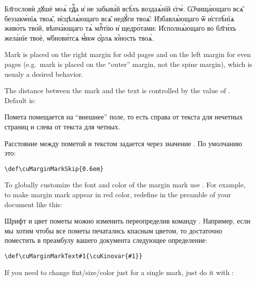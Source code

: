 \begin{center}
\begin{churchslavonic}
\let\hMn=\cuMarginMark
\let\hKv=\cuKinovar
\parbox{0.75\textwidth}{%
  \textwidth
  \hMn{в҃}\hKv Бл҃гословѝ дꙋшѐ моѧ̀ гдⷭ҇а и҆ не забыва́й всѣ́хъ  воздаѧ́нїй є҆гѡ̀. 
  \hMn{а҃}\hKv Ѡ҆чища́ющаго всѧ̑ беззакѡ́нїѧ твоѧ̑, и҆сцѣлѧ́ющаго  всѧ̑ недꙋ́ги твоѧ̑:
  \hMn{в҃}\hKv И҆збавлѧ́ющаго ѿ и҆стлѣ́нїѧ  живо́тъ тво́й, вѣнча́ющаго тѧ̀ млⷭ҇тїю и҆ щедро́тами: 
  \hMn{а҃}\hKv И҆сполнѧ́ющаго во бл҃ги́хъ жела́нїе твоѐ, ѡ҆бнови́тсѧ  ꙗ҆́кѡ ѻ҆́рлѧ ю҆́ность твоѧ̀.
}
\end{churchslavonic}
\end{center}

\begin{EN}
Mark is placed on the right margin for odd pages and on the left margin for even pages (e.g.~mark is placed on the
``outer'' margin, not the spine margin), which is usualy a desired behavior.

The distance between the mark and the text is controlled by the value of . Default is:
\end{EN}
%
\begin{RU}
Помета помещается на ``внешнее'' поле, то есть справа от текста для нечетных страниц и слева от текста для четных.

Расстояние между пометой и текстом задается через значение . По умолчанию это:
\end{RU}
%
\begin{verbatim}
\def\cuMarginMarkSkip{0.6em}
\end{verbatim}

\begin{EN}
To globally customize the font and color of the margin mark use .
For example, to make margin mark appear in red color, redefine  in the preamble of your
document like this:
\end{EN}
%
\begin{RU}
Шрифт и цвет пометы можно изменить переопределив команду .
Например, если мы хотим чтобы все пометы печатались кпасным цветом, то достаточно поместить
в преамбулу вашего документа следующее определение: 
\end{RU}
\begin{verbatim}
\def\cuMarginMarkText#1{\cuKinovar{#1}}
\end{verbatim}

\begin{EN}
If you need to change fint/size/color just for a single mark, just do it with :
\end{EN}

